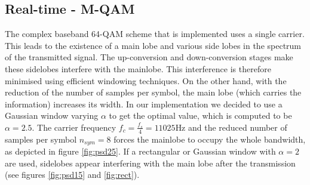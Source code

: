 \documentclass[12pt,a4paper,openright]{report}
\begin{document}
\subsection{Real-time - M-QAM}
The complex baseband 64-QAM scheme that is implemented uses a single carrier. This leads to the existence of a main lobe and various side lobes in the spectrum of the transmitted signal. The up-conversion and down-conversion stages make these sidelobes interfere with the mainlobe. This interference is therefore minimised using efficient windowing techniques.  On the other hand, with the reduction of the number of samples per symbol, the main lobe
(which carries the information) increases its width. In our implementation we decided to use a  Gaussian window varying $\alpha$ to get the optimal value, which is computed to be  $\alpha = 2.5$. The carrier frequency  $ f_c = \frac{f_s}{4}=11025$Hz and the reduced number of samples per symbol $n_{sym} = 8$ forces the mainlobe to occupy the whole bandwidth, as depicted in figure \ref{fig:psd25}. If a rectangular or Gaussian window with $\alpha = 2$ are used, sidelobes appear interfering with the main lobe after the transmission (see figures \ref{fig:psd15} and \ref{fig:rect}). 
\end{document}

